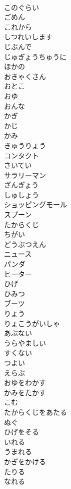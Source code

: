 \documentclass[8pt]{extreport}
\begin{document}
\begin{CJK}{UTF8}{min}
\\	このぐらい	
\\	ごめん	
\\	これから	
\\	しつれいします	
\\	じぶんで	
\\	じゅぎょうちゅうに	
\\	ほかの	
\\	おきゃくさん	
\\	おとこ	
\\	おゆ	
\\	おんな	
\\	かぎ	
\\	かじ	
\\	かみ	
\\	きゅうりょう	
\\	コンタクト	
\\	さいてい	
\\	サラリーマン	
\\	ざんぎょう	
\\	しゅしょう	
\\	ショッピングモール	
\\	スプーン	
\\	たからくじ	
\\	ちがい	
\\	どうぶつえん	
\\	ニュース	
\\	パンダ	
\\	ヒーター	
\\	ひげ	
\\	ひみつ	
\\	ブーツ	
\\	りょう	
\\	りょこうがいしゃ	
\\	あぶない	
\\	うらやましい	
\\	すくない	
\\	つよい	
\\	えらぶ	
\\	おゆをわかす	
\\	かみをたかす	
\\	こむ	
\\	たからくじをあたる	
\\	ぬぐ	
\\	ひげをそる	
\\	いれる	
\\	うまれる	
\\	かぎをかける	
\\	たりる	
\\	なれる	

\end{CJK}
\end{document}
